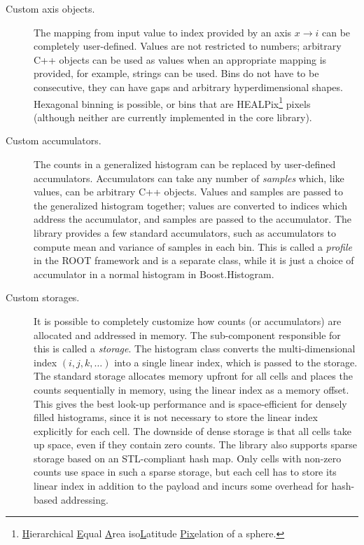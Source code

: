 \documentclass{webofc}
\begin{document}
\begin{description}

    \item[Custom axis objects.] The mapping from input value to index provided by an axis $x \rightarrow i$ can be completely user-defined. Values are not restricted to numbers; arbitrary C++ objects can be used as values when an appropriate mapping is provided, for example, strings can be used. Bins do not have to be consecutive, they can have gaps and arbitrary hyperdimensional shapes. Hexagonal binning is possible, or bins that are HEALPix\footnote{\underline{H}ierarchical \underline{E}qual \underline{A}rea iso\underline{L}atitude \underline{Pix}elation of a sphere.} pixels~\cite{gorski2005healpix} (although neither are currently implemented in the core library).

\item[Custom accumulators.] The counts in a generalized histogram can be replaced by user-defined accumulators. Accumulators can take any number of \emph{samples} which, like values, can be arbitrary C++ objects. Values and samples are passed to the generalized histogram together; values are converted to indices which address the accumulator, and samples are passed to the accumulator. The library provides a few standard accumulators, such as accumulators to compute mean and variance of samples in each bin. This is called a \emph{profile} in the ROOT framework and is a separate class, while it is just a choice of accumulator in a normal histogram in Boost.Histogram.

\item[Custom storages.] It is possible to completely customize how counts (or accumulators) are allocated and addressed in memory. The sub-component responsible for this is called a \emph{storage}. The histogram class converts the multi-dimensional index $(i,j,k,\dots)$ into a single linear index, which is passed to the storage. The standard storage allocates memory upfront for all cells and places the counts sequentially in memory, using the linear index as a memory offset. This gives the best look-up performance and is space-efficient for densely filled histograms, since it is not necessary to store the linear index explicitly for each cell. The downside of dense storage is that all cells take up space, even if they contain zero counts. The library also supports sparse storage based on an STL-compliant hash map. Only cells with non-zero counts use space in such a sparse storage, but each cell has to store its linear index in addition to the payload and incurs some overhead for hash-based addressing.


\end{description}
\end{document}
